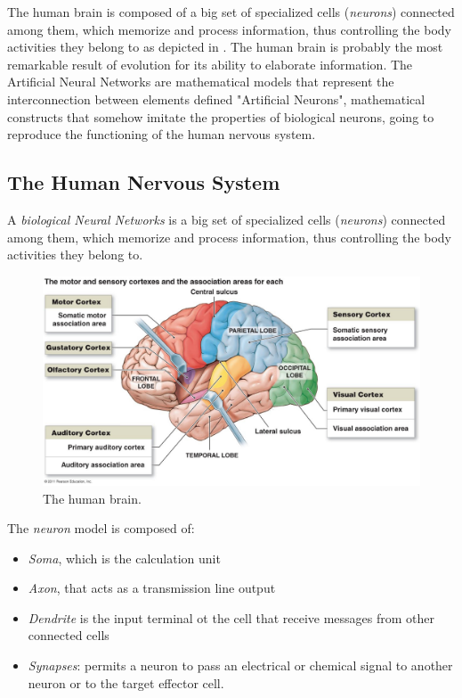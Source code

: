 The human brain is composed of a big set of specialized cells (\textit{neurons}) connected among them, which memorize and process information, thus controlling the body activities they belong to as depicted in . The human brain is probably the most remarkable result of evolution for its ability to elaborate information. 
The Artificial Neural Networks are mathematical models that represent the interconnection between elements defined "Artificial Neurons", mathematical constructs that somehow imitate the properties of biological neurons, going to reproduce the functioning of the human nervous system.

\subsection{The Human Nervous System} 
A \textit{biological Neural Networks} is a big set of specialized cells (\textit{neurons}) connected among them, which memorize and process information, thus controlling the body activities they belong to.

\begin{figure}[t]
	\label{fig:brain}
	\centering
	\includegraphics[width=0.65\linewidth]{img/Brain}
	\caption{The human brain.}
\end{figure}

The \textit{neuron} model is composed of:
\begin{itemize}
	\item \textit{Soma}, which is the calculation unit
	\item \textit{Axon}, that acts as a transmission line output
	\item \textit{Dendrite} is the input terminal ot the cell that receive messages from other connected cells
	\item \textit{Synapses}: permits a neuron to pass an electrical or chemical signal to another neuron or to the target effector cell.
\end{itemize}

